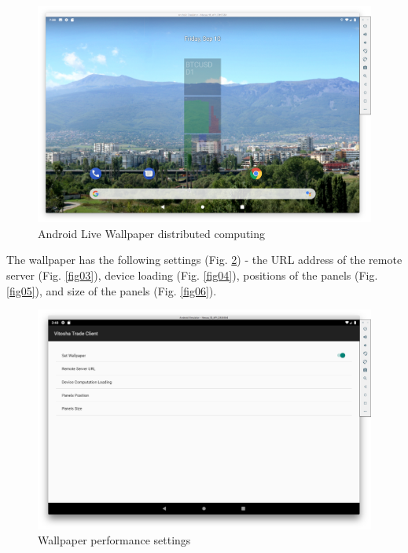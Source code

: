 \documentclass[a4paper,conference]{IEEEtran}
\begin{document}
\begin{figure}[htbp]
\centerline{\includegraphics[width=1.0\linewidth]{fig01.png}}
\caption{Android Live Wallpaper distributed computing}
\label{fig01}
\end{figure}

The wallpaper has the following settings (Fig. \ref{fig02}) - the URL address of the remote server (Fig. \ref{fig03}), device loading (Fig. \ref{fig04}), positions of the panels (Fig. \ref{fig05}), and size of the panels (Fig. \ref{fig06}).

\begin{figure}[htbp]
\centerline{\includegraphics[width=1.0\linewidth]{fig02.png}}
\caption{Wallpaper performance settings}
\label{fig02}
\end{figure}
\end{document}
